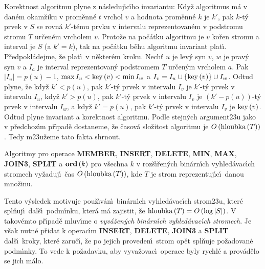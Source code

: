 \flushpar Korektnost algoritmu plyne z n\'asleduj\'\i c\'\i ho invariantu:  
Kdy\v z algoritmus m\'a v dan\'em okam\v ziku v prom\v enn\'e $t$ vrchol $
v$ 
a hodnota prom\v enn\'e $k$ je $k'$, pak $k$-t\'y prvek v $S$ se rovn\'a 
$k'$-t\'emu prvku v intervalu reprezentovan\'em v podstromu 
stromu $T$ ur\v cen\'em vrcholem $v$.  Proto\v ze na po\v c\'atku algoritmu 
je $v$ ko\v ren stromu a interval je $S$ (a $k'=k$), tak na po\v c\'atku 
b\v ehu algoritmu invariant plat\'\i.  P\v redpokl\'adejme, \v ze plat\'\i\ v 
n\v ekter\'em kroku.  Nech\v t $u$ je lev\'y syn $v$, $w$ je prav\'y syn $
v$ a 
$I_a$ je interval reprezentovan\'y podstromem $T$ ur\v cen\'ym vrcholem $
a$.  
Pak $|I_u|=p\left(u\right)-1$, $\max I_u<\operatorname{key}\left(v\right)<\min I_w$ a 
$I_v=I_u\cup \left\{\operatorname{key}\left(v\right)\right\}\cup I_w$.  Odtud plyne, \v ze kdy\v z $k'
<p\left(u\right)$, pak 
$k'$-t\'y prvek v intervalu $I_v$ je $k'$-t\'y prvek v intervalu $
I_u$, kdy\v z 
$k'>p\left(u\right)$, pak $k'$-t\'y prvek v intervalu $I_v$ je $\left(k'-p\left(u\right)\right)$-t\'y prvek 
v intervalu $I_w$, a kdy\v z $k'=p\left(u\right)$, pak $k'$-t\'y prvek v intervalu $
I_v$ 
je $\operatorname{key}\left(v\right)$.  Odtud plyne invariant a korektnost algoritmu.  
Podle stejn\'ych argument\accent23u jako v p\v redchoz\'\i m p\v r\'\i pad\v e 
dostaneme, \v ze \v casov\'a slo\v zitost algoritmu je $O\left(\operatorname{hloubka}
\left(T\right)\right)$.  
Tedy m\accent23u\v zeme tato fakta shrnout.  

Algoritmy pro operace {\bf MEMBER}, {\bf INSERT}, {\bf DE\-LE\-TE}, {\bf MIN}, {\bf MAX}, 
{\bf JOIN3}, {\bf SPLIT} a $\bold o\bold r\bold d\left(k\right)$ pro v\v sechna $
k$ v roz\v s\'\i\v ren\'ych bin\'ar\-n\'\i ch 
vy\-hled\'avac\'\i ch stromech vy\v zaduj\'\i\ \v cas $O\left(\operatorname{hloubka}
\left(T\right)\right)$, kde $T$ je strom reprezentuj\'\i c\'\i\ danou mno\v zinu. 
\endproclaim


\flushpar Tento v\'ysledek motivuje pou\v z\'\i v\'an\'\i\ bin\'arn\'\i ch 
vyhled\'avac\'\i ch strom\accent23u, kter\'e spl\v nuj\'\i\ dal\v s\'\i\ 
podm\'\i nku, kter\'a m\'a zajistit, \v ze 
$\operatorname{hloubka}\left(T\right)=O\left(\log|S|\right)$.  V takov\'emto p\v r\'\i pad\v e mluv\'\i me o 
\emph{vyv\'a\v zen\'ych} \emph{bin\'arn\'\i ch} 
\emph{vyhled\'avac\'\i ch} \emph{stromech}.  Je v\v sak nutn\'e 
p\v ridat k ope\-rac\'\i m {\bf INSERT}, {\bf DELETE}, {\bf JOIN3} a {\bf SPLIT} dal\v s\'\i\ 
kroky, kter\'e 
zaru\v c\'\i , \v ze po jejich proveden\'\i\ strom op\v et spl\v nuje 
po\v zadovan\'e podm\'\i nky.  To vede k po\v zadavku, aby 
vyva\v zovac\'\i\ operace byly rychl\'e a prov\'ad\v elo se jich m\'alo.  
\medskip

